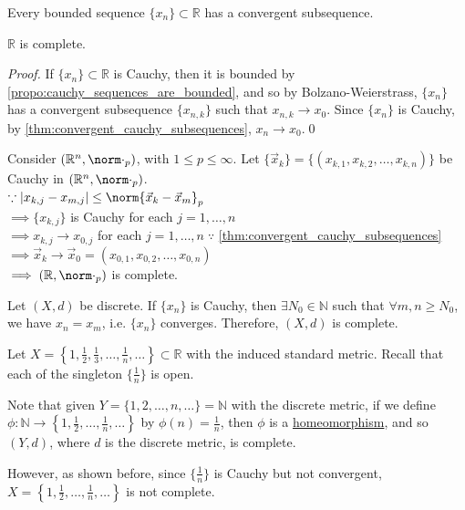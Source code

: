 \documentclass[notoc,notitlepage]{tufte-book}
\begin{document}
\begin{thm}\label{thm:bolzano_weierstrass}
  Every bounded sequence $\{ x_n \} \subset \mathbb{R}$ has a convergent subsequence.
\end{thm}

\begin{thm}\label{thm:r_is_complete}
  $\mathbb{R}$ is complete.
\end{thm}

\begin{proof}
  If $\{ x_n \} \subset \mathbb{R}$ is Cauchy, then it is bounded by \cref{propo:cauchy_sequences_are_bounded}, and so by Bolzano-Weierstrass, $\{ x_n \}$ has a convergent subsequence $\{ x_{n, k} \}$ such that $x_{n, k} \to x_0$. Since $\{ x_n \}$ is Cauchy, by \cref{thm:convergent_cauchy_subsequences}, $x_n \to x_0$.\qed\
\end{proof}

\begin{eg}
  Consider $(\mathbb{R}^n, \norm\cdot_p)$, with $1 \leq p \leq \infty$. Let $\{ \vec{x}_k \} = \{ (x_{k, 1}, x_{k, 2}, \ldots, x_{k, n}) \}$ be Cauchy in $(\mathbb{R}^n, \norm\cdot_p)$. \\
  \noindent$\because \abs{x_{k, j} - x_{m, j} } \leq \norm{\vec{x}_k - \vec{x}_m}_p$ \\
  $\implies \{ x_{k, j} \}$ is Cauchy for each $j = 1, \ldots, n$ \\
  $\implies x_{k, j} \to x_{0, j}$ for each $j = 1, \ldots, n \; \because$ \cref{thm:convergent_cauchy_subsequences} \\
  $\implies \vec{x}_k \to \vec{x}_0 = (x_{0, 1}, x_{0, 2}, \ldots, x_{0, n})$ \\
  $\implies (\mathbb{R}, \norm\cdot_p)$ is complete.
\end{eg}

\begin{eg}
  Let $(X, d)$ be discrete. If $\{ x_n \}$ is Cauchy, then $\exists N_0 \in \mathbb{N}$ such that $\forall m, n \geq N_0$, we have $x_n = x_m$, i.e. $\{ x_n \}$ converges. Therefore, $(X, d)$ is complete.
\end{eg}

\begin{eg}[\imponote]
  Let $X = \left\{ 1, \frac{1}{2}, \frac{1}{3}, \ldots, \frac{1}{n}, \ldots \right\} \subset \mathbb{R}$ with the induced standard metric. Recall that each of the singleton $\{ \frac{1}{n} \}$ is open.

  Note that given $Y = \{ 1, 2, \ldots, n, \ldots \} = \mathbb{N}$ with the discrete metric, if we define $\phi : \mathbb{N} \to \left\{ 1, \frac{1}{2}, \ldots, \frac{1}{n}, \ldots \right\}$ by $\phi(n) = \frac{1}{n}$, then $\phi$ is a \hyperref[defn:homeomorphism]{homeomorphism}, and so $(Y, d)$, where $d$ is the discrete metric, is complete.

  However, as shown before, since $\{ \frac{1}{n} \}$ is Cauchy but not convergent, $X = \left\{ 1, \frac{1}{2}, \ldots, \frac{1}{n}, \ldots \right\}$ is not complete.
\end{eg}
\end{document}
